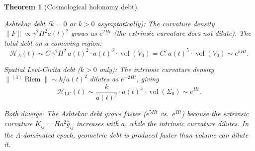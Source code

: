 \documentclass[12pt]{amsart}
\newtheorem{theorem}{Theorem}[section]
\theoremstyle{definition}
\newcommand{\vol}{\operatorname{vol}}
\newcommand{\Riem}{\operatorname{Riem}}
\begin{document}
\begin{theorem}[Cosmological holonomy debt]
\begin{enumerate}[label=\textup{(\Roman*)}]
\emph{Ashtekar debt ($k = 0$ or $k > 0$ asymptotically):} The curvature density $\|F\| \propto \gamma^2 H^2 a(t)^2$ grows as $e^{2Ht}$ (the extrinsic curvature does not dilute).  The total debt on a comoving region:
\[
\mathcal{H}_A(t) \sim C\,\gamma^2 H^2\,a(t)^2 \cdot a(t)^3 \cdot \vol(V_0) = C'\,a(t)^5 \cdot \vol(V_0) \sim e^{5Ht}.
\]

\emph{Spatial Levi-Civita debt ($k > 0$ only):} The intrinsic curvature density $\|{}^{(3)}\Riem\| \sim k/a(t)^2$ dilutes as $e^{-2Ht}$, giving
\[
\mathcal{H}_{\mathrm{LC}}(t) \sim \frac{k}{a(t)^2} \cdot a(t)^3 \cdot \vol(\Sigma_0) \sim e^{Ht}.
\]

Both diverge.  The Ashtekar debt grows faster ($e^{5Ht}$ vs.\ $e^{Ht}$) because the extrinsic curvature $K_{ij} = Ha^2\bar{g}_{ij}$ increases with $a$, while the intrinsic curvature dilutes.  In the $\Lambda$-dominated epoch, geometric debt is produced faster than volume can dilute it.
\end{enumerate}
\end{theorem}
\end{document}
